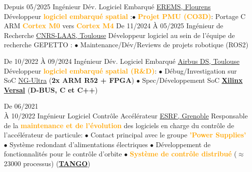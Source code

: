 \documentclass[
	a4paper,
	subsectioncolor=cvblue!70,
]{fortysecondscv}
\newcommand{\tango}{\href{https://www.tango-controls.org/}{TANGO}}
\newcommand{\hl}[1]{\textbf{\textcolor{orange}{#1}}}
\begin{document}
\begin{cvtable}[2]
  \cvitem
      {Depuis 05/2025}
      {Ingénieur Dév. Logiciel Embarqué}
      {\href{https://www.erems.fr/fr/}{EREMS, Flourens}}
  {
    Développeur \hl{logiciel embarqué spatial}
    :\newline $\bullet$ {
      \hl{\textbf{Projet PMU (CO3D)}}: Portage C ARM \hl{Cortex M0} vers \hl{Cortex M4}
    }
  }
  \cvitem
      {De 11/2024 \newline À 05/2025}
      {Ingénieur de Recherche}
      {\href{https://www.laas.fr/public/fr}{CNRS-LAAS, Toulouse}}
  {
    Développeur logiciel au sein de l'équipe de recherche GEPETTO
    :
    \newline $\bullet$ {
      Maintenance/Dév/Reviews de projets robotique (ROS2)
    }
  }

  \cvitem
      {De 10/2022 \newline À 09/2024}
      {Ingénieur Dév. Logiciel Embarqué}
      {\href{https://fr.wikipedia.org/wiki/Airbus_Defence_and_Space}{Airbus DS, Toulouse}}
  {
    Développeur \hl{logiciel embarqué spatial (R\&D)}:
    \newline $\bullet$ {
      Débug/Investigation sur SoC
      \href{https://nanoxplore.org/index.php/product/ng-ultra/}{NG-Ultra}
      (\textbf{2x ARM R52 + FPGA})
    }
    \newline $\bullet$ {
      Spec/Développement SoC
      \hl{
        \href{https://www.xilinx.com/products/silicon-devices/acap/versal-ai-core.html}
             {Xilinx Versal}
      } (\textbf{D-BUS, C et C++})
    }
  }

  \cvitem
      {De 06/2021\\À 10/2022}
      {Ingénieur Logiciel Contrôle Accélérateur}
      {\href{https://www.esrf.fr/}{ESRF, Grenoble}}
  {
    Responsable de la \hl{maintenance et de l'évolution} des logiciels en charge
    du contrôle de l'accélérateur de particule:
    \newline $\bullet$ {
      Contact principal avec le groupe \hl{'Power Supplies'}
    }
    \newline $\bullet$ {
      Système redondant d'alimentations électriques
    }
    \newline $\bullet$ {
      Développement de fonctionnalités pour le contrôle d'orbite
    }
    \newline $\bullet$ {
      \hl{Système de contrôle distribué} ($\approx$ 23000 processus)
      (\textbf{\tango})
    }
  }


\end{cvtable}
\end{document}
